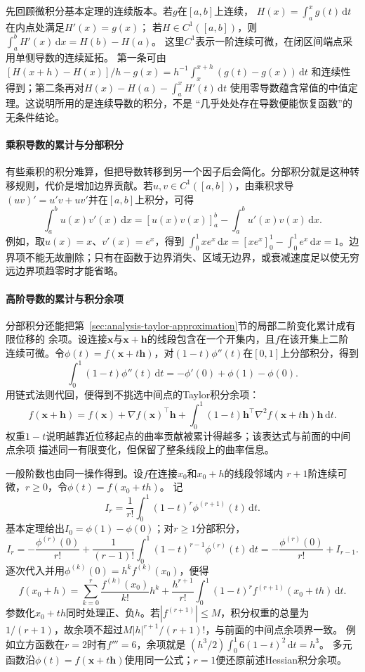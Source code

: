先回顾微积分基本定理的连续版本。若$g$在$[a,b]$上连续，
$H(x)=\int_a^xg(t)\,\mathrm dt$在内点处满足$H'(x)=g(x)$；
若$H\in C^1([a,b])$，则$\int_a^bH'(x)\,\mathrm dx=H(b)-H(a)$。
这里$C^1$表示一阶连续可微，在闭区间端点采用单侧导数的连续延拓。
第一条可由
$[H(x+h)-H(x)]/h-g(x)=h^{-1}\int_x^{x+h}(g(t)-g(x))\,\mathrm dt$
和连续性得到；第二条再对$H(x)-H(a)-\int_a^xH'(t)\,\mathrm dt$
使用零导数蕴含常值的中值定理。这说明所用的是连续导数的积分，不是
“几乎处处存在导数便能恢复函数”的无条件结论。

\paragraph{乘积导数的累计与分部积分}
有些乘积的积分难算，但把导数转移到另一个因子后会简化。分部积分就是这种转移规则，代价是增加边界贡献。若$u,v\in C^1([a,b])$，由乘积求导$(uv)'=u'v+uv'$并在$[a,b]$上积分，可得
\begin{equation}
  \int_a^b u(x)v'(x)\,\mathrm{d}x
  =
  [u(x)v(x)]_a^b
  -
  \int_a^b u'(x)v(x)\,\mathrm{d}x.
\label{eq:analysis-integration-by-parts}
\end{equation}
例如，取$u(x)=x$、$v'(x)=e^x$，得到 $\int_0^1xe^x\,\mathrm{d}x=[xe^x]_0^1-\int_0^1e^x\,\mathrm{d}x=1$。边界项不能无故删除；只有在函数于边界消失、区域无边界，或衰减速度足以使无穷远边界项趋零时才能省略。

\paragraph{高阶导数的累计与积分余项}
分部积分还能把第~\ref{sec:analysis-taylor-approximation}节的局部二阶变化累计成有限位移的
余项。设连接$\bm{x}$与$\bm{x}+\bm{h}$的线段包含在一个开集内，且$f$在该开集上二阶
连续可微。令$\phi(t)=f(\bm{x}+t\bm{h})$，对$(1-t)\phi''(t)$在$[0,1]$上分部积分，得到
\[
  \int_0^1(1-t)\phi''(t)\,\mathrm{d}t
  =-\phi'(0)+\phi(1)-\phi(0).
\]
用链式法则代回，便得到不挑选中间点的Taylor积分余项：
\[   f(\bm{x}+\bm{h})   =   f(\bm{x})   +\nabla f(\bm{x})^{\top}\bm{h}   +   \int_0^1(1-t)   \bm{h}^{\top}\nabla^2f(\bm{x}+t\bm{h})\bm{h}\,\mathrm{d}t. \]
权重$1-t$说明越靠近位移起点的曲率贡献被累计得越多；该表达式与前面的中间点余项
描述同一有限变化，但保留了整条线段上的曲率信息。

一般阶数也由同一操作得到。设$f$在连接$x_0$和$x_0+h$的线段邻域内
$r+1$阶连续可微，$r\geq0$，令$\phi(t)=f(x_0+th)$。
记
\[
 I_r=\frac1{r!}\int_0^1(1-t)^r\phi^{(r+1)}(t)\,\mathrm dt.
\]
基本定理给出$I_0=\phi(1)-\phi(0)$；对$r\geq1$分部积分，
\[
 I_r=-\frac{\phi^{(r)}(0)}{r!}
       +\frac1{(r-1)!}\int_0^1(1-t)^{r-1}\phi^{(r)}(t)\,\mathrm dt
     =-\frac{\phi^{(r)}(0)}{r!}+I_{r-1}.
\]
逐次代入并用$\phi^{(k)}(0)=h^k f^{(k)}(x_0)$，便得
\begin{equation}
 f(x_0+h)=\sum_{k=0}^r\frac{f^{(k)}(x_0)}{k!}h^k
 +\frac{h^{r+1}}{r!}
   \int_0^1(1-t)^r f^{(r+1)}(x_0+th)\,\mathrm dt.
\label{eq:analysis-taylor-integral-remainder}
\end{equation}
参数化$x_0+th$同时处理正、负$h$。若$|f^{(r+1)}|\leq M$，积分权重的总量为
$1/(r+1)$，故余项不超过$M|h|^{r+1}/(r+1)!$，与前面的中间点余项界一致。
例如立方函数在$r=2$时有$f'''=6$，余项就是
$(h^3/2)\int_0^1 6(1-t)^2\,\mathrm dt=h^3$。
多元函数沿$\phi(t)=f(\bm x+t\bm h)$使用同一公式；$r=1$便还原前述Hessian积分余项。

